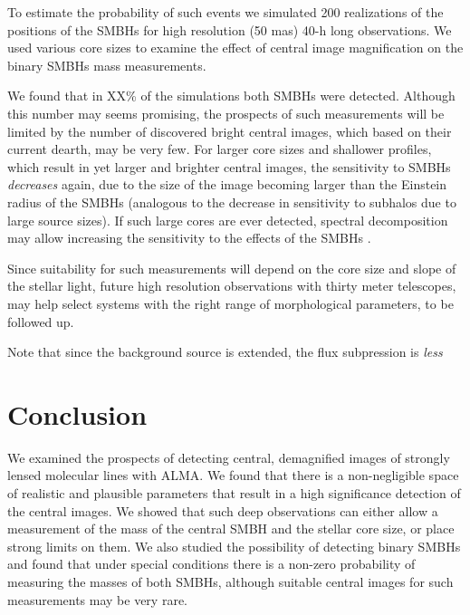 \documentclass[chicago]{emulateapj}
\begin{document}
To estimate the probability of such events we simulated 200 realizations of the positions of the SMBHs for high resolution (50 mas) 40-h long observations. We used various core sizes to examine the effect of central image magnification on the binary SMBHs mass measurements.


We found that in XX\% of the simulations both SMBHs were detected. 
  Although this number may seems promising, the prospects of such measurements will be limited by the number of discovered bright central images, which based on their current dearth, may be very few.
  For larger core sizes and shallower profiles, which result in yet larger and brighter central images, the sensitivity to SMBHs \emph{decreases} again, due to the size of the image becoming larger than the Einstein radius of the SMBHs (analogous to the decrease in sensitivity to subhalos due to large source sizes). If such large cores are ever detected, spectral decomposition may allow increasing the sensitivity to the effects of the SMBHs \citep{hezaveh:13a}.

Since suitability for such measurements will depend on the core size and slope of the stellar light, future high resolution observations with thirty meter telescopes, may help select systems with the right range of morphological parameters, to be followed up.

Note that since the background source is extended, the flux subpression is \emph{less}



\section{Conclusion}
We examined the prospects of detecting central, demagnified images of strongly lensed molecular lines with ALMA. We found that there is a non-negligible space of realistic and plausible parameters that result in a high significance detection of the central images. We showed that such deep observations can either allow a measurement of the mass of the central SMBH and the stellar core size, or place strong limits on them.
We also studied the possibility of detecting binary SMBHs and found that under special conditions there is a non-zero probability of measuring the masses of both SMBHs, although suitable central images for such measurements may be very rare.





%
\end{document}
